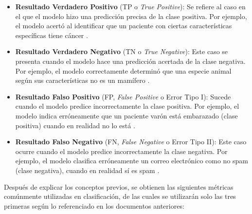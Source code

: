 \begin{itemize}
    \item \textbf{Resultado Verdadero Positivo} (TP o \textit{True Positive}): Se refiere al caso en el que el modelo hizo una predicción precisa de la clase positiva. Por ejemplo, el modelo acertó al identificar que un paciente con ciertas características específicas tiene cáncer \parencite{gl_google2018machinelearning}.
    \item \textbf{Resultado Verdadero Negativo} (TN o \textit{True Negative}): Este caso se presenta cuando el modelo hace una predicción acertada de la clase negativa. Por ejemplo, el modelo correctamente determinó que una especie animal según sus características no es un mamífero \parencite{gl_google2018machinelearning}.
    \item \textbf{Resultado Falso Positivo} (FP, \textit{False Positive} o Error Tipo I): Sucede cuando el modelo predice incorrectamente la clase positiva. Por ejemplo, el modelo indica erróneamente que un paciente varón está embarazado (clase positiva) cuando en realidad no lo está \parencite{gl_google2018machinelearning}.
    \item \textbf{Resultado Falso Negativo} (FN, \textit{False Negative} o Error Tipo II): Este caso ocurre cuando el modelo predice incorrectamente la clase negativa. Por ejemplo, el modelo clasifica erróneamente un correo electrónico como no spam (clase negativa), cuando en realidad sí es spam \parencite{gl_google2018machinelearning}.
    \end{itemize}

    Después de explicar los conceptos previos, se obtienen las siguientes métricas comúnmente utilizadas en clasificación, de las cuales se utilizarán solo las tres primeras según lo referenciado en los documentos anteriores:

